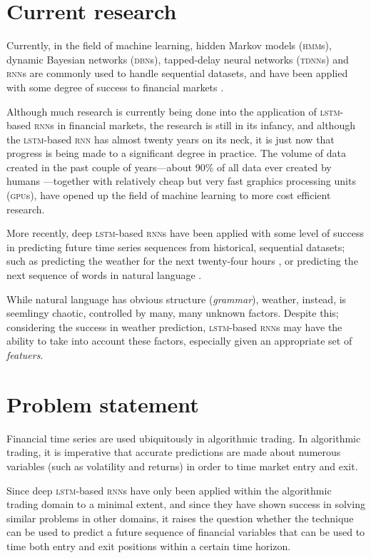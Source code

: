 \section{Current research}
Currently, in the field of machine learning, hidden Markov models
(\textsc{hmm}s), dynamic Bayesian networks (\textsc{dbn}s), tapped-delay neural
networks (\textsc{tdnn}s) and \textsc{rnn}s are commonly used to handle
sequential datasets, and have been applied with some degree of success to
financial markets \citep{saad1998,kita2012,zhang2004}.

Although much research is currently being done into the application of
\textsc{lstm}-based \textsc{rnn}s in financial markets, the research is still in
its infancy, and although the \textsc{lstm}-based \textsc{rnn} has almost twenty
years on its neck, it is just now that progress is being made to a significant
degree in practice.  The volume of data created in the past couple of
years---about 90\% of all data ever created by humans
\citep*{devakunchari2014}---together with relatively cheap but very fast
graphics processing units (\textsc{gpu}s), have opened up the field of machine
learning to more cost efficient research.

More recently, deep \textsc{lstm}-based \textsc{rnn}s have been applied with
some level of success in predicting future time series sequences from
historical, sequential datasets; such as predicting the weather for the next
twenty-four hours \citep*{zaytar2016}, or predicting the next sequence of words
in natural language \citep*{quoc2014}.

While natural language has obvious structure (\textit{grammar}), weather,
instead, is seemlingy chaotic, controlled by many, many unknown factors.
Despite this; considering the success in weather prediction, \textsc{lstm}-based
\textsc{rnn}s may have the ability to take into account these factors,
especially given an appropriate set of \textit{featuers}.

\section{Problem statement}
Financial time series are used ubiquitously in algorithmic trading.  In
algorithmic trading, it is imperative that accurate predictions are made about
numerous variables (such as volatility and returns) in order to time market
entry and exit.

Since deep \textsc{lstm}-based \textsc{rnn}s have only been applied within the
algorithmic trading domain to a minimal extent, and since they have shown
success in solving similar problems in other domains, it raises the question
whether the technique can be used to predict a future sequence of financial
variables that can be used to time both entry and exit positions within a
certain time horizon.

